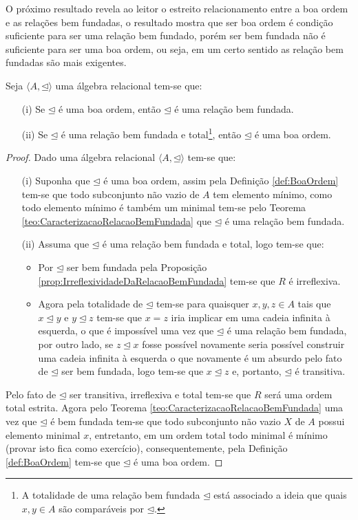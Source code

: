 O próximo resultado revela ao leitor o estreito relacionamento entre a boa ordem e as relações bem fundadas, o resultado mostra que ser boa ordem é condição suficiente para ser uma relação bem fundado, porém ser bem fundada não é suficiente para ser uma boa ordem, ou seja, em um certo sentido as relação bem fundadas são mais exigentes.

\begin{teorema}\label{teo:RelacoesBemFundada-BoaOrdem}
	Seja $\langle A, \unlhd \rangle$ uma álgebra relacional tem-se que:
	\begin{itemize}
		\item[(i)] Se $\unlhd$ é uma boa ordem, então $\unlhd$ é uma relação bem fundada.
		\item[(ii)] Se $\unlhd$ é uma relação bem fundada e total\footnote{A totalidade de uma relação bem fundada $\unlhd$ está associado a ideia que quais $x, y \in A$ são comparáveis por $\unlhd$.}, então $\unlhd$ é uma boa ordem.
	\end{itemize}
\end{teorema}

\begin{proof}
	Dado uma álgebra relacional $\langle A, \unlhd \rangle$ tem-se que:
	\begin{itemize}
		\item[(i)] Suponha que $\unlhd$ é uma boa ordem, assim pela Definição \ref{def:BoaOrdem} tem-se que todo subconjunto não vazio de $A$ tem elemento mínimo, como todo elemento mínimo é também um minimal tem-se pelo Teorema \ref{teo:CaracterizacaoRelacaoBemFundada} que $\unlhd$ é uma relação bem fundada.
		\item[(ii)] Assuma que $\unlhd$ é uma relação bem fundada e total, logo tem-se que:
		\begin{itemize}
			\item Por $\unlhd$ ser bem fundada pela Proposição \ref{prop:IrreflexividadeDaRelacaoBemFundada} tem-se que $R$ é irreflexiva.
			\item Agora pela totalidade de $\unlhd$ tem-se para quaisquer $x, y, z \in A$ tais que $x \unlhd y$ e $y \unlhd z$ tem-se que $x = z$ iria implicar em uma cadeia infinita à esquerda, o que é impossível uma vez que $\unlhd$ é uma relação bem fundada, por outro lado, se $z \unlhd x$ fosse possível novamente seria possível construir uma cadeia infinita à esquerda o que novamente é um absurdo pelo fato de $\unlhd$ ser bem fundada, logo tem-se que $x \unlhd z$ e, portanto, $\unlhd$ é transitiva.
		\end{itemize}
	\end{itemize}
	Pelo fato de $\unlhd$ ser transitiva, irreflexiva e total tem-se que $R$ será uma ordem total estrita. Agora pelo Teorema \ref{teo:CaracterizacaoRelacaoBemFundada} uma vez que $\unlhd$ é bem fundada tem-se que todo subconjunto não vazio $X$ de $A$ possui elemento minimal $x$, entretanto, em um ordem total todo minimal é mínimo (provar isto fica como exercício), consequentemente, pela Definição \ref{def:BoaOrdem} tem-se que $\unlhd$ é uma boa ordem.
\end{proof}

